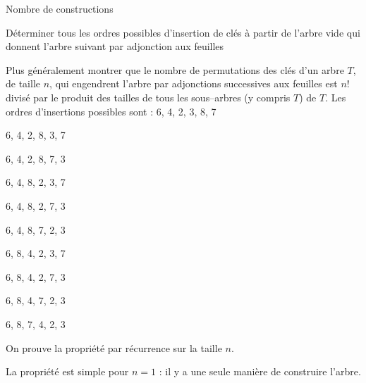 \begin{exo}{Nombre de constructions}{}

Déterminer tous les ordres possibles d'insertion de clés à partir de l'arbre vide qui donnent l'arbre suivant par adjonction aux feuilles

\begin{center}
\end{center}


Plus généralement montrer que le nombre de permutations des clés d'un arbre $T$, de taille $n$, qui engendrent l'arbre par adjonctions successives aux feuilles est $n!$ divisé par le produit des tailles de tous les sous--arbres (y compris $T$) de $T$.
\reponse
Les ordres d'insertions possibles sont :
6, 4, 2, 3, 8, 7

6, 4, 2, 8, 3, 7

6, 4, 2, 8, 7, 3

6, 4, 8, 2, 3, 7

6, 4, 8, 2, 7, 3

6, 4, 8, 7, 2, 3

6, 8, 4, 2, 3, 7

6, 8, 4, 2, 7, 3

6, 8, 4, 7, 2, 3

6, 8, 7, 4, 2, 3

\medskip

On prouve la propriété par récurrence sur la taille $n$.

La propriété est simple pour $n=1$ : il y a une seule manière de construire l'arbre.


\end{exo}
